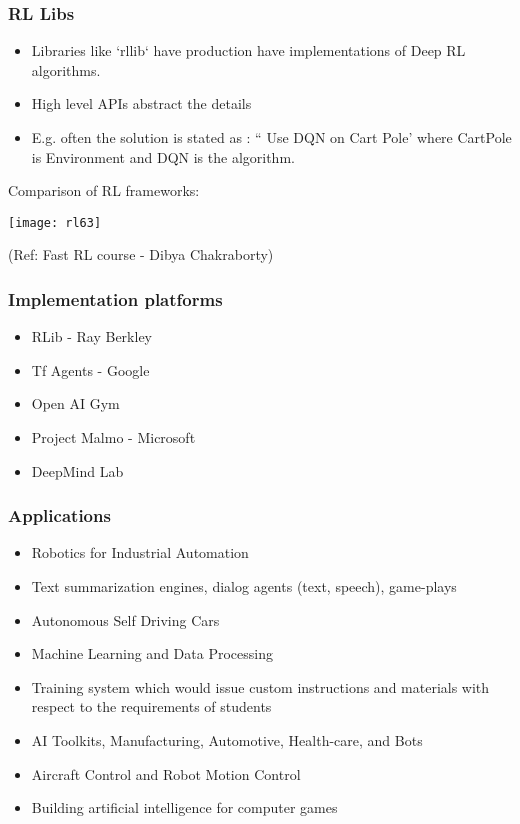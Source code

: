 \begin{frame}[fragile]\frametitle{RL Libs}

\begin{itemize}
\item Libraries like `rllib` have production have implementations of Deep RL algorithms.
\item High level APIs abstract the details
\item E.g. often the solution is stated as : `` Use DQN on Cart Pole' where CartPole is Environment and DQN is the algorithm.
\end{itemize}

Comparison of RL frameworks:

\begin{center}
\texttt{[image: rl63]}

{\tiny (Ref: Fast RL course - Dibya Chakraborty)}
\end{center}

\end{frame}

\begin{frame}[fragile]\frametitle{Implementation platforms}

\begin{itemize}
\item RLib - Ray Berkley
\item Tf Agents - Google
\item Open AI Gym
\item Project Malmo - Microsoft
\item DeepMind Lab
\end{itemize}

\end{frame}

\begin{frame}[fragile]\frametitle{Applications}

\begin{itemize}
\item Robotics for Industrial Automation
\item Text summarization engines, dialog agents (text, speech), game-plays
\item Autonomous Self Driving Cars
\item Machine Learning and Data Processing
\item Training system which would issue custom instructions and materials with respect to the requirements of students
\item AI Toolkits, Manufacturing, Automotive, Health-care, and Bots
\item Aircraft Control and Robot Motion Control
\item Building artificial intelligence for computer games
\end{itemize}

\end{frame}

